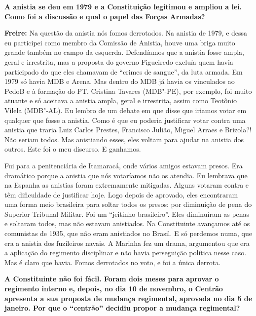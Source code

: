 \textbf{A anistia se deu em 1979 e a Constituição legitimou e ampliou a
lei. Como foi a discussão e qual o papel das Forças Armadas?}

\textbf{Freire:} Na questão da anistia nós fomos derrotados. Na anistia
de 1979, e dessa eu participei como membro da Comissão de Anistia, houve
uma briga muito grande também no campo da esquerda. Defendíamos que a
anistia fosse ampla, geral e irrestrita, mas a proposta do governo
Figueiredo excluía quem havia participado do que eles chamavam de
``crimes de sangue'', da luta armada. Em 1979 só havia MDB e Arena. Mas
dentro do MDB já havia os vinculados ao PcdoB e à formação do PT.
Cristina Tavares (MDB"-PE), por exemplo, foi muito atuante e só aceitava
a anistia ampla, geral e irrestrita, assim como Teotônio Vilela
(MDB"-AL). Eu lembro de um debate em que disse que iriamos votar em
qualquer que fosse a anistia. Como é que eu poderia justificar votar
contra uma anistia que traria Luiz Carlos Prestes, Francisco Julião,
Miguel Arraes e Brizola?! Não seriam todos. Mas anistiando esses, eles
voltam para ajudar na anistia dos outros. Este foi o meu discurso. E
ganhamos.

Fui para a penitenciária de Itamaracá, onde vários amigos estavam
presos. Era dramático porque a anistia que nós votaríamos não os
atendia. Eu lembrava que na Espanha as anistias foram extremamente
mitigadas. Alguns votaram contra e têm dificuldade de justificar hoje.
Logo depois de aprovado, eles encontraram uma forma meio brasileira para
soltar todos os presos: por diminuição de pena do Superior Tribunal
Militar. Foi um ``jeitinho brasileiro''. Eles diminuíram as penas e
soltaram todos, mas não estavam anistiados. Na Constituinte avançamos
até os comunistas de 1935, que não eram anistiados no Brasil. E só
perdemos numa, que era a anistia dos fuzileiros navais. A Marinha fez um
drama, argumentou que era a aplicação do regimento disciplinar e não
havia perseguição política nesse caso. Mas é claro que havia. Fomos
derrotados no voto, e foi a única derrota.

\textbf{A Constituinte não foi fácil. Foram dois meses para aprovar o
regimento interno e, depois, no dia 10 de novembro, o Centrão apresenta
a sua proposta de mudança regimental, aprovada no dia 5 de janeiro. Por
que o ``centrão'' decidiu propor a mudança regimental?}

